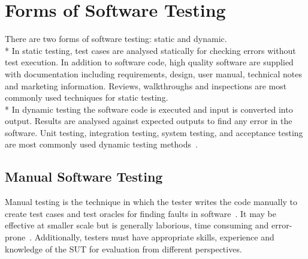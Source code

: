 \section{Forms of Software Testing}
There are two forms of software testing: static and dynamic. \\*
In static testing, test cases are analysed statically for checking errors without test execution. In addition to software code, high quality software are supplied with documentation including requirements, design, user manual, technical notes and marketing information. Reviews, walkthroughs and inspections are most commonly used techniques for static testing.\\*
In dynamic testing the software code is executed and input is converted into output. Results are analysed against expected outputs to find any error in the software. Unit testing, integration testing, system testing, and acceptance testing are most commonly used dynamic testing methods~\cite{fairley1978tutorial}.


\subsection{Manual Software Testing}
Manual testing is the technique in which the tester writes the code manually to create test cases and test oracles for finding faults in software~\cite{ciupa2008finding}. It may be effective at smaller scale but is generally laborious, time consuming and error-prone~\cite{tretmans2000automatic}. Additionally, testers must have appropriate skills, experience and knowledge of the SUT for evaluation from different perspectives.
 
